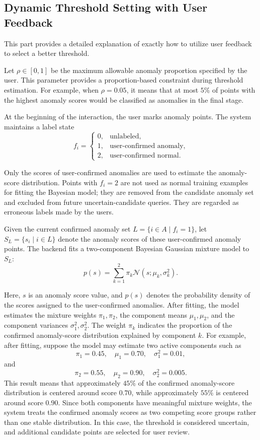 \subsection{Dynamic Threshold Setting with User Feedback}

This part provides a detailed explanation of exactly how to utilize user feedback to select a better threshold.

Let \(\rho \in [0,1]\) be the maximum allowable anomaly proportion specified by the user. This parameter provides a proportion-based constraint during threshold estimation. For example, when \(\rho=0.05\), it means that at most \(5\%\) of points with the highest anomaly scores would be classified as anomalies in the final stage.

At the beginning of the interaction, the user marks anomaly points. The system maintains a label state
\[
f_i =
\begin{cases}
0, & \text{unlabeled},\\
1, & \text{user-confirmed anomaly},\\
2, & \text{user-confirmed normal}.
\end{cases}
\]

Only the scores of user-confirmed anomalies are used to estimate the anomaly-score distribution. Points with \(f_i=2\) are not used as normal training examples for fitting the Bayesian model; they are removed from the candidate anomaly set and excluded from future uncertain-candidate queries. They are regarded as erroneous labels made by the users.

Given the current confirmed anomaly set \(L=\{i\in A\mid f_i=1\}\), let \(S_L=\{s_i\mid i\in L\}\) denote the anomaly scores of these user-confirmed anomaly points. The backend fits a two-component Bayesian Gaussian mixture model to \(S_L\):
\[p(s)=\sum_{k=1}^{2}\pi_k\mathcal{N}(s;\mu_k,\sigma_k^2).\]

Here, \(s\) is an anomaly score value, and \(p(s)\) denotes the probability density of the scores assigned to the user-confirmed anomalies. After fitting, the model estimates the mixture weights \(\pi_1,\pi_2\), the component means \(\mu_1,\mu_2\), and the component variances \(\sigma_1^2,\sigma_2^2\). The weight \(\pi_k\) indicates the proportion of the confirmed anomaly-score distribution explained by component \(k\). For example, after fitting, suppose the model may estimate two active components such as
\[ \pi_1=0.45,\quad \mu_1=0.70,\quad \sigma_1^2=0.01, \]
and
\[ \pi_2=0.55,\quad \mu_2=0.90,\quad \sigma_2^2=0.005. \]
This result means that approximately \(45\%\) of the confirmed anomaly-score distribution is centered around score \(0.70\), while approximately \(55\%\) is centered around score \(0.90\). Since both components have meaningful mixture weights, the system treats the confirmed anomaly scores as two competing score groups rather than one stable distribution. In this case, the threshold is considered uncertain, and additional candidate points are selected for user review.


